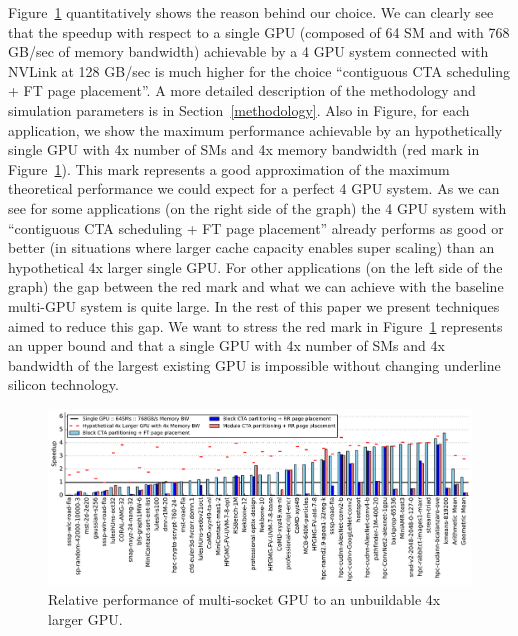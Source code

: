 Figure~\ref{fig:motivation2} quantitatively shows the reason behind our 
choice. We can clearly see that the speedup with respect to a single GPU 
(composed of 64 SM and with 768 GB/sec of memory bandwidth) achievable by a 4 
GPU system connected with NVLink at 128 GB/sec is much higher for the choice 
``contiguous CTA scheduling + FT page placement''. A more detailed 
description of the methodology and simulation parameters is in 
Section~\ref{methodology}. 
Also in Figure, for each application, we show the maximum  performance 
achievable by an hypothetically single GPU with 4x number of SMs and 4x 
memory bandwidth (red mark in Figure~\ref{fig:motivation2}). This mark 
represents a good approximation of the 
maximum theoretical performance we could expect for a perfect 4 GPU system. 
As we can see for some applications (on the right side of the graph) the 4 
GPU system with ``contiguous CTA scheduling + FT page placement'' already 
performs as good or better (in situations where larger cache capacity enables 
super scaling) than an hypothetical 4x larger single GPU. For other 
applications (on the left side of the graph) the gap between the red mark and 
what we can achieve with the baseline multi-GPU system is quite large. In the 
rest of this paper we present techniques aimed to reduce this gap. 
We want to stress the red mark in Figure~\ref{fig:motivation2} represents an 
upper bound and that a single GPU with 4x number of SMs and 4x bandwidth of 
the largest existing GPU is impossible without changing underline silicon 
technology. 






\begin{figure}[tp]
    \centering
    \includegraphics[width=1\linewidth]{figures/plot_different_baselines.pdf}
    \caption{Relative performance of multi-socket GPU to an unbuildable 4x larger GPU.}
    \label{fig:motivation2}
\end{figure}




